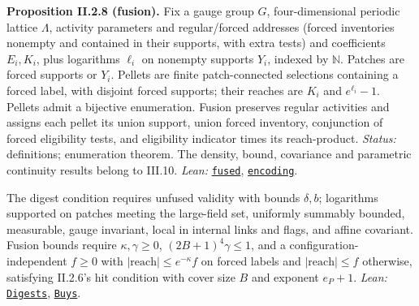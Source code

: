 \documentclass[
  letterpaper,
  11pt]{article}
\newcounter{none} %
\begin{document}
\textbf{Proposition II.2.8 (fusion).} Fix a gauge group \(G\),
four-dimensional periodic lattice \(\Lambda\), activity parameters and
regular/forced addresses (forced inventories nonempty and contained in
their supports, with extra tests) and coefficients \(E_i,K_i\), plus
logarithms \(\ell_i\) on nonempty supports \(Y_i\), indexed by
\(\mathbb N\). Patches are forced supports or \(Y_i\). Pellets are
finite patch-connected selections containing a forced label, with
disjoint forced supports; their reaches are \(K_i\) and
\(e^{\ell_i}-1\). Pellets admit a bijective enumeration. Fusion
preserves regular activities and assigns each pellet its union support,
union forced inventory, conjunction of forced eligibility tests, and
eligibility indicator times its reach-product. \emph{Status:}
definitions; enumeration theorem. The density, bound, covariance and
parametric continuity results belong to III.10. \emph{Lean:}
\href{https://github.com/yang-mills-group/OpenAI-YM-20261028/blob/3456e5e75cf8d4cd558955a5c7638fba2d68f464/YM/Ovens/Coffee.lean\#L78}{\texttt{fused}},
\href{https://github.com/yang-mills-group/OpenAI-YM-20261028/blob/3456e5e75cf8d4cd558955a5c7638fba2d68f464/YM/Ovens/Coffee.lean\#L121-L133}{\texttt{encoding}}.

The digest condition requires unfused validity with bounds \(\delta,b\);
logarithms supported on patches meeting the large-field set, uniformly
summably bounded, measurable, gauge invariant, local in internal links
and flags, and affine covariant. Fusion bounds require
\(\kappa,\gamma\ge0\), \((2B+1)^4\gamma\le1\), and a
configuration-independent \(f\ge0\) with
\(|\mathrm{reach}|\le e^{-\kappa}f\) on forced labels and
\(|\mathrm{reach}|\le f\) otherwise, satisfying II.2.6's hit condition
with cover size \(B\) and exponent \(e_P+1\). \emph{Lean:}
\href{https://github.com/yang-mills-group/OpenAI-YM-20261028/blob/3456e5e75cf8d4cd558955a5c7638fba2d68f464/YM/Ovens/Coffee.lean\#L81-L90}{\texttt{Digests}},
\href{https://github.com/yang-mills-group/OpenAI-YM-20261028/blob/3456e5e75cf8d4cd558955a5c7638fba2d68f464/YM/Ovens/Coffee.lean\#L94-L98}{\texttt{Buys}}.
\end{document}
